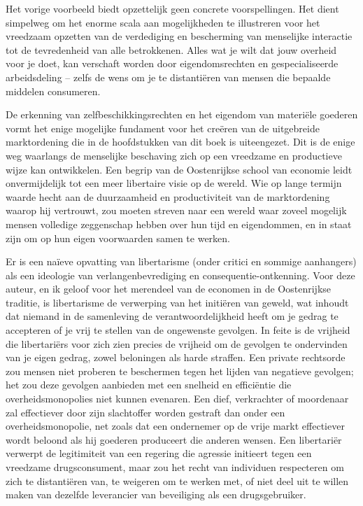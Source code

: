 \documentclass[
  a5paper,
  smalldemyvopaper,11pt,twoside,onecolumn,openright,extrafontsizes,
hidelinks]{memoir}
\begin{document}
Het vorige voorbeeld biedt opzettelijk geen concrete voorspellingen. Het
dient simpelweg om het enorme scala aan mogelijkheden te illustreren
voor het vreedzaam opzetten van de verdediging en bescherming van
menselijke interactie tot de tevredenheid van alle betrokkenen. Alles
wat je wilt dat jouw overheid voor je doet, kan verschaft worden door
eigendomsrechten en gespecialiseerde arbeidsdeling -- zelfs de wens om
je te distantiëren van mensen die bepaalde middelen consumeren.

De erkenning van zelfbeschikkingsrechten en het eigendom van materiële
goederen vormt het enige mogelijke fundament voor het creëren van de
uitgebreide marktordening die in de hoofdstukken van dit boek is
uiteengezet. Dit is de enige weg waarlangs de menselijke beschaving zich
op een vreedzame en productieve wijze kan ontwikkelen. Een begrip van de
Oostenrijkse school van economie leidt onvermijdelijk tot een meer
libertaire visie op de wereld. Wie op lange termijn waarde hecht aan de
duurzaamheid en productiviteit van de marktordening waarop hij
vertrouwt, zou moeten streven naar een wereld waar zoveel mogelijk
mensen volledige zeggenschap hebben over hun tijd en eigendommen, en in
staat zijn om op hun eigen voorwaarden samen te werken.

Er is een naïeve opvatting van libertarisme (onder critici en sommige
aanhangers) als een ideologie van verlangenbevrediging en
consequentie-ontkenning. Voor deze auteur, en ik geloof voor het
merendeel van de economen in de Oostenrijkse traditie, is libertarisme
de verwerping van het initiëren van geweld, wat inhoudt dat niemand in
de samenleving de verantwoordelijkheid heeft om je gedrag te accepteren
of je vrij te stellen van de ongewenste gevolgen. In feite is de
vrijheid die libertariërs voor zich zien precies de vrijheid om de
gevolgen te ondervinden van je eigen gedrag, zowel beloningen als harde
straffen. Een private rechtsorde zou mensen niet proberen te beschermen
tegen het lijden van negatieve gevolgen; het zou deze gevolgen aanbieden
met een snelheid en efficiëntie die overheidsmonopolies niet kunnen
evenaren. Een dief, verkrachter of moordenaar zal effectiever door zijn
slachtoffer worden gestraft dan onder een overheidsmonopolie, net zoals
dat een ondernemer op de vrije markt effectiever wordt beloond als hij
goederen produceert die anderen wensen. Een libertariër verwerpt de
legitimiteit van een regering die agressie initieert tegen een vreedzame
drugsconsument, maar zou het recht van individuen respecteren om zich te
distantiëren van, te weigeren om te werken met, of niet deel uit te
willen maken van dezelfde leverancier van beveiliging als een
drugsgebruiker.
\end{document}
